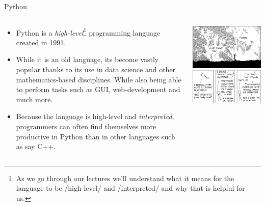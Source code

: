 \documentclass[10pt]{beamer}
\newcommand{\footnoteframe}[1]{\footnote[frame]{#1}}
\begin{document}
\begin{frame}[label={sec:orgf12785c}]{Python}
\begin{columns}
\begin{column}{0.6\columnwidth}
\begin{itemize}
\item Python is a \emph{high-level}\footnoteframe{As we go through our lectures we'll understand what it means for the language to be /high-level/ and /interpreted/ and why that is helpful for us.} programming language created in 1991.
\item While it is an old language, its become vastly popular thanks to its use in data
science and other mathematics-based disciplines. While also being able to perform
tasks such as GUI, web-development and much more.
\item Because the language is high-level and \emph{interpreted}, programmers can often find
themselves more productive in Python than in other languages such as say C++.
\end{itemize}
\end{column}

\begin{column}{0.3\columnwidth}
\begin{center}
\includegraphics[width=\textwidth]{./images/python.png}
\end{center}
\end{column}
\end{columns}
\end{frame}
\end{document}
